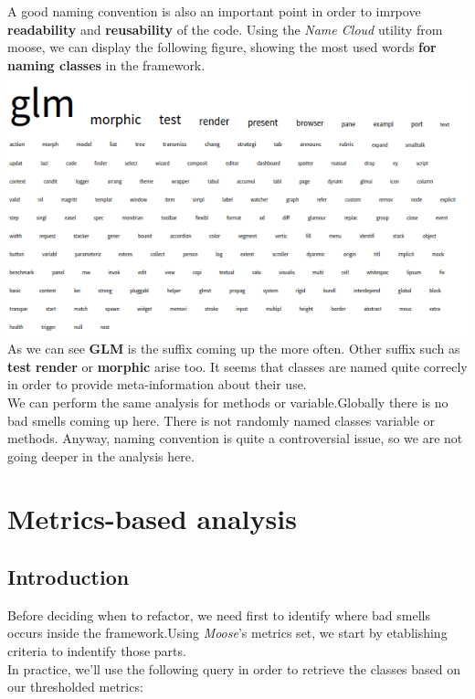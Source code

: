 \documentclass[11pt,a4paper]{article}
\begin{document}
A good naming convention is also an important point in order to imrpove \textbf{readability} and \textbf{reusability} of the code. Using the \textit{Name Cloud} utility from moose, we can display the following figure, showing the most used words \textbf{for naming classes} in the framework.\\
\includegraphics[width=\textwidth]{name_cloud}
\\
As we can see \textbf{GLM} is the suffix coming up the more often. Other suffix such as \textbf{test} \textbf{render} or \textbf{morphic} arise too. It seems that classes are named quite correcly in order to provide meta-information about their use.\\

We can perform the same analysis for methods or variable.Globally there is no bad smells coming up here. There is not randomly named classes variable or methods. Anyway, naming convention is quite a controversial issue, so we are not going deeper in the analysis here. 
\section{Metrics-based analysis}
\subsection{Introduction}
Before deciding when to refactor, we need first to identify where bad smells occurs inside the framework.Using \textit{Moose}'s metrics set, we start by etablishing criteria to indentify those parts.\\ 

In practice, we'll use the following query in order to retrieve the classes based on our thresholded metrics:\\
\end{document}
